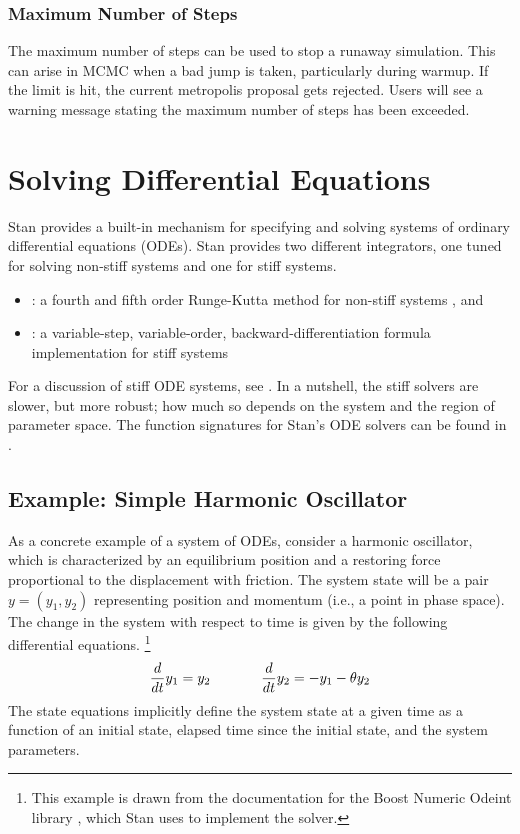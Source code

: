 \subsection{Maximum Number of Steps}
%
The maximum number of steps can be used to stop a runaway simulation. This can arise in
MCMC when a bad jump is taken, particularly during warmup. If the limit is hit, the
current metropolis proposal gets rejected. Users will see a  warning message stating the
maximum number of steps has been exceeded.


\chapter{Solving Differential Equations}\label{ode-solver.chapter}

\noindent
Stan provides a built-in mechanism for specifying and solving systems
of ordinary differential equations (ODEs).  Stan provides two
different integrators, one tuned for solving non-stiff systems and one
for stiff systems.
%
\begin{itemize}
\item {}: a fourth and fifth order Runge-Kutta method for
  non-stiff systems \citep{DormandPrince:1980,AhnertMulansky:2011}, and
\item {}: a variable-step, variable-order,
  backward-differentiation formula implementation for stiff systems
  \citep{CohenHindmarsh:1996,SerbanHindmarsh:2005}
\end{itemize}
%
For a discussion of stiff ODE systems, see .  In
a nutshell, the stiff solvers are slower, but more robust;  how much
so depends on the system and the region of parameter space.
The function signatures for Stan's ODE solvers can be found in
.


\section{Example: Simple Harmonic Oscillator}

As a concrete example of a system of ODEs, consider a harmonic
oscillator, which is characterized by an equilibrium position and a
restoring force proportional to the displacement with friction.
The system state will be a pair $y = (y_1, y_2)$ representing position
and momentum (i.e., a point in phase space).  The change in the system
with respect to time is given by the following differential equations.%
%
\footnote{This example is drawn from the documentation for the Boost
  Numeric Odeint library \citep{AhnertMulansky:2011}, which Stan uses
  to implement the  solver.}
%
\begin{equation}\label{ode-sho.equation}
\frac{d}{dt} y_1 = y_2
\hspace*{0.5in}
\frac{d}{dt} y_2 = -y_1 - \theta y_2
\end{equation}
%
The state equations implicitly define the system state at a given time
as a function of an initial state, elapsed time since the initial
state, and the system parameters.

